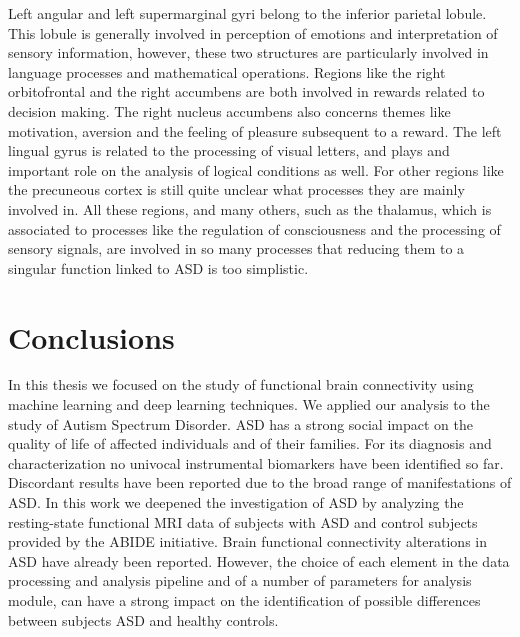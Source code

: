 \documentclass[11pt]{report}
\begin{document}
Left angular and left supermarginal gyri belong to the inferior parietal lobule.
This lobule is generally involved in perception of emotions and interpretation of sensory information, however, these two structures are particularly involved in language processes and mathematical operations.
Regions like the right orbitofrontal and the right accumbens are both involved in rewards related to decision making.
The right nucleus accumbens also concerns themes like motivation, aversion and the feeling of pleasure subsequent to a reward.
The left lingual gyrus is related to the processing of visual letters, and plays and important role on the analysis of logical conditions as well.
For other regions like the precuneous cortex is still quite unclear what processes they are mainly involved in.
All these regions, and many others, such as the thalamus, which is associated to processes like the regulation of consciousness and the processing of sensory signals, are involved in so many processes that reducing them to a singular function linked to ASD is too simplistic.



\chapter{Conclusions}


In this thesis we focused on the study of functional brain connectivity using machine learning and deep learning techniques.
We applied our analysis to the study of Autism Spectrum Disorder. ASD has a strong social impact on the quality of life of affected individuals and of their families. For its diagnosis and characterization no univocal instrumental biomarkers have been identified so far. Discordant results have been reported due to the broad range of  manifestations of ASD.
In this work we deepened the investigation of ASD by analyzing the resting-state functional MRI data of subjects with ASD and control subjects provided by the ABIDE initiative.
Brain functional connectivity alterations in ASD have already been reported. However, the choice of each element in the data processing and analysis pipeline and of a number of parameters for analysis module, can have a strong impact on the identification of possible differences between subjects ASD and healthy controls.  
\end{document}

